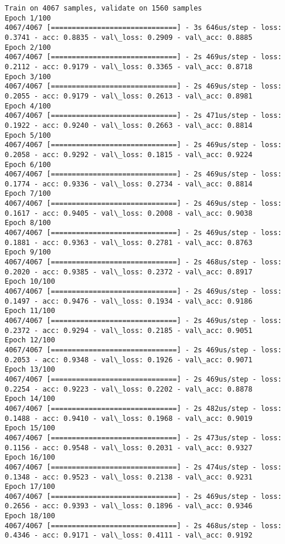 \documentclass[11pt]{article}
\begin{document}
    \begin{Verbatim}[commandchars=\\\{\}]
Train on 4067 samples, validate on 1560 samples
Epoch 1/100
4067/4067 [==============================] - 3s 646us/step - loss: 0.3741 - acc: 0.8835 - val\_loss: 0.2909 - val\_acc: 0.8885
Epoch 2/100
4067/4067 [==============================] - 2s 469us/step - loss: 0.2112 - acc: 0.9179 - val\_loss: 0.3365 - val\_acc: 0.8718
Epoch 3/100
4067/4067 [==============================] - 2s 469us/step - loss: 0.2055 - acc: 0.9179 - val\_loss: 0.2613 - val\_acc: 0.8981
Epoch 4/100
4067/4067 [==============================] - 2s 471us/step - loss: 0.1922 - acc: 0.9240 - val\_loss: 0.2663 - val\_acc: 0.8814
Epoch 5/100
4067/4067 [==============================] - 2s 469us/step - loss: 0.2058 - acc: 0.9292 - val\_loss: 0.1815 - val\_acc: 0.9224
Epoch 6/100
4067/4067 [==============================] - 2s 469us/step - loss: 0.1774 - acc: 0.9336 - val\_loss: 0.2734 - val\_acc: 0.8814
Epoch 7/100
4067/4067 [==============================] - 2s 469us/step - loss: 0.1617 - acc: 0.9405 - val\_loss: 0.2008 - val\_acc: 0.9038
Epoch 8/100
4067/4067 [==============================] - 2s 469us/step - loss: 0.1881 - acc: 0.9363 - val\_loss: 0.2781 - val\_acc: 0.8763
Epoch 9/100
4067/4067 [==============================] - 2s 468us/step - loss: 0.2020 - acc: 0.9385 - val\_loss: 0.2372 - val\_acc: 0.8917
Epoch 10/100
4067/4067 [==============================] - 2s 469us/step - loss: 0.1497 - acc: 0.9476 - val\_loss: 0.1934 - val\_acc: 0.9186
Epoch 11/100
4067/4067 [==============================] - 2s 469us/step - loss: 0.2372 - acc: 0.9294 - val\_loss: 0.2185 - val\_acc: 0.9051
Epoch 12/100
4067/4067 [==============================] - 2s 469us/step - loss: 0.2053 - acc: 0.9348 - val\_loss: 0.1926 - val\_acc: 0.9071
Epoch 13/100
4067/4067 [==============================] - 2s 469us/step - loss: 0.2254 - acc: 0.9223 - val\_loss: 0.2202 - val\_acc: 0.8878
Epoch 14/100
4067/4067 [==============================] - 2s 482us/step - loss: 0.1488 - acc: 0.9410 - val\_loss: 0.1968 - val\_acc: 0.9019
Epoch 15/100
4067/4067 [==============================] - 2s 473us/step - loss: 0.1156 - acc: 0.9548 - val\_loss: 0.2031 - val\_acc: 0.9327
Epoch 16/100
4067/4067 [==============================] - 2s 474us/step - loss: 0.1348 - acc: 0.9523 - val\_loss: 0.2138 - val\_acc: 0.9231
Epoch 17/100
4067/4067 [==============================] - 2s 469us/step - loss: 0.2656 - acc: 0.9393 - val\_loss: 0.1896 - val\_acc: 0.9346
Epoch 18/100
4067/4067 [==============================] - 2s 468us/step - loss: 0.4346 - acc: 0.9171 - val\_loss: 0.4111 - val\_acc: 0.9192

\end{Verbatim}
\end{document}
